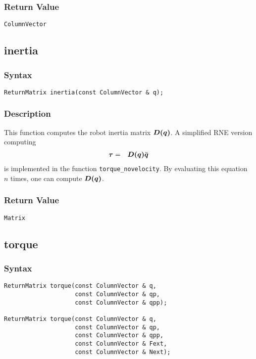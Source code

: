 \documentclass[11pt,fleqn,letterpaper]{report}
\newcommand{\mbold}[1]{\mbox{\boldmath $ #1 $}}
\begin{document}

\subsubsection*{Return Value}

{\tt ColumnVector}

\newpage

\subsection*{inertia}
\subsubsection*{Syntax}
\begin{verbatim}
ReturnMatrix inertia(const ColumnVector & q);
\end{verbatim}
\subsubsection*{Description}
This function computes the robot inertia matrix $\mbold{D(q)}$. A simplified RNE version computing 
\begin{eqnarray}
\mbold{\tau} & = & \mbold{D(q)} \ddot{\mbold{q}}
\end{eqnarray}
is implemented in the function {\tt torque\_novelocity}. By evaluating this equation $n$ times, 
one can compute $\mbold{D(q)}$.


\subsubsection*{Return Value}

{\tt Matrix}

\newpage

\subsection*{torque}
\subsubsection*{Syntax}
\begin{verbatim}
ReturnMatrix torque(const ColumnVector & q, 
                    const ColumnVector & qp,
                    const ColumnVector & qpp);

ReturnMatrix torque(const ColumnVector & q,
                    const ColumnVector & qp,
                    const ColumnVector & qpp,
                    const ColumnVector & Fext,
                    const ColumnVector & Next);
\end{verbatim}
\end{document}
